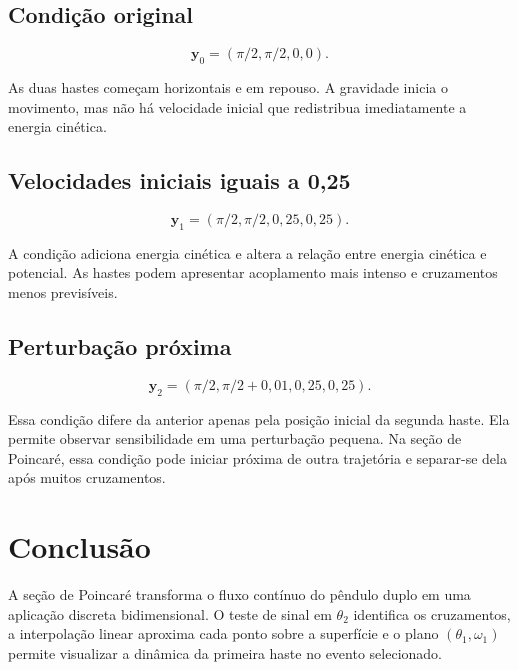 \documentclass[12pt,a4paper]{article}
\begin{document}
\subsection{Condição original}

\begin{equation}
\mathbf y_0=(\pi/2,\pi/2,0,0).
\end{equation}

As duas hastes começam horizontais e em repouso. A gravidade inicia o movimento, mas não há velocidade inicial que redistribua imediatamente a energia cinética.

\subsection{Velocidades iniciais iguais a 0,25}

\begin{equation}
\mathbf y_1=(\pi/2,\pi/2,0{,}25,0{,}25).
\end{equation}

A condição adiciona energia cinética e altera a relação entre energia cinética e potencial. As hastes podem apresentar acoplamento mais intenso e cruzamentos menos previsíveis.

\subsection{Perturbação próxima}

\begin{equation}
\mathbf y_2=(\pi/2,\pi/2+0{,}01,0{,}25,0{,}25).
\end{equation}

Essa condição difere da anterior apenas pela posição inicial da segunda haste. Ela permite observar sensibilidade em uma perturbação pequena. Na seção de Poincaré, essa condição pode iniciar próxima de outra trajetória e separar-se dela após muitos cruzamentos.

\section{Conclusão}

A seção de Poincaré transforma o fluxo contínuo do pêndulo duplo em uma aplicação discreta bidimensional. O teste de sinal em $\theta_2$ identifica os cruzamentos, a interpolação linear aproxima cada ponto sobre a superfície e o plano $(\theta_1,\omega_1)$ permite visualizar a dinâmica da primeira haste no evento selecionado.
\end{document}
